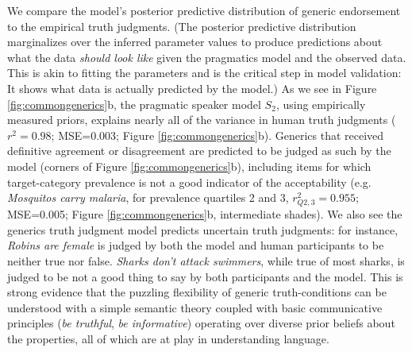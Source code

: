 \documentclass[12pt,letterpaper]{article}
\begin{document}
We compare the model's posterior predictive distribution of generic endorsement to the empirical truth judgments.
(The posterior predictive distribution marginalizes over the inferred parameter values to produce predictions about what the data \emph{should look like} given the pragmatics model and the observed data. 
This is akin to fitting the parameters and is the critical step in model validation: It shows what data is actually predicted by the model.) 
As we see in Figure \ref{fig:commongenerics}b, the pragmatic speaker model $S_2$, using empirically measured priors, explains nearly all of the variance in human truth judgments ($r^2=0.98$; MSE=0.003; Figure \ref{fig:commongenerics}b). 
Generics that received definitive agreement or disagreement are predicted to be judged as such by the model (corners of Figure \ref{fig:commongenerics}b), including items for which target-category prevalence is not a good indicator of the acceptability (e.g. \emph{Mosquitos carry malaria}, for prevalence quartiles 2 and 3, $r_{Q2,3}^2=0.955$; MSE=0.005; Figure \ref{fig:commongenerics}b, intermediate shades).
We also see the generics truth judgment model predicts uncertain truth judgments: for instance, \emph{Robins are female} is judged by both the model and human participants to be neither true nor false.
\emph{Sharks don't attack swimmers}, while true of most sharks, is judged to be not a good thing to say by both participants and the model.
This is strong evidence that the puzzling flexibility of generic truth-conditions can be understood with a simple semantic theory coupled with basic communicative principles (\emph{be truthful}, \emph{be informative}) operating over diverse prior beliefs about the properties, all of which are at play in understanding language. 

%
\end{document}
